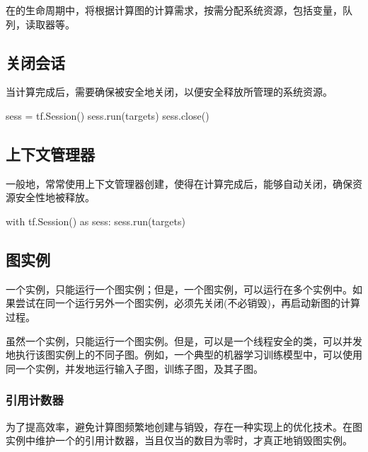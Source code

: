 \begin{content}

在的生命周期中，将根据计算图的计算需求，按需分配系统资源，包括变量，队列，读取器等。

\subsection{关闭会话}

当计算完成后，需要确保被安全地关闭，以便安全释放所管理的系统资源。

\begin{leftbar}
\begin{python}
sess = tf.Session()
sess.run(targets)
sess.close()
\end{python}
\end{leftbar}

\subsection{上下文管理器}

一般地，常常使用上下文管理器创建，使得在计算完成后，能够自动关闭，确保资源安全性地被释放。

\begin{leftbar}
\begin{python}
with tf.Session() as sess:
  sess.run(targets)
\end{python}
\end{leftbar}

\subsection{图实例}

一个实例，只能运行一个图实例；但是，一个图实例，可以运行在多个实例中。如果尝试在同一个运行另外一个图实例，必须先关闭(不必销毁)，再启动新图的计算过程。

虽然一个实例，只能运行一个图实例。但是，可以是一个线程安全的类，可以并发地执行该图实例上的不同子图。例如，一个典型的机器学习训练模型中，可以使用同一个实例，并发地运行输入子图，训练子图，及其子图。

\subsubsection{引用计数器}

为了提高效率，避免计算图频繁地创建与销毁，存在一种实现上的优化技术。在图实例中维护一个的引用计数器，当且仅当的数目为零时，才真正地销毁图实例。


\end{content}
